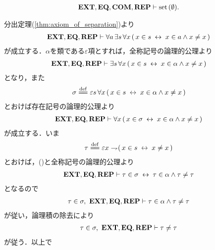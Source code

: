 	\begin{screen}
		\begin{thm}\label{thm:emptyset_is_a_set}
			\begin{align}
				\mbox{{\bf EXT}},\mbox{{\bf EQ}},\mbox{\bf COM},\mbox{{\bf REP}} \vdash \operatorname*{set}\hspace{0.15em}(\emptyset).
			\end{align}
		\end{thm}
	\end{screen}
	
	\begin{sketch}
		分出定理(\ref{thm:axiom_of_separation})より
		\begin{align}
			\mbox{{\bf EXT}},\mbox{{\bf EQ}},\mbox{{\bf REP}} \vdash \forall a\, \exists s\, \forall x\,
			(\, x \in s \hspace{0.25em}\leftrightarrow\hspace{0.25em} x \in a \wedge x \neq x\, )
			\label{fom:thm_emptyset_is_a_set_1}
		\end{align}
		が成立する．$\alpha$を類である$\varepsilon$項とすれば，全称記号の論理的公理より
		\begin{align}
			\mbox{{\bf EXT}},\mbox{{\bf EQ}},\mbox{{\bf REP}} \vdash \exists s\, \forall x\,
			(\, x \in s \hspace{0.25em}\leftrightarrow\hspace{0.25em} x \in \alpha \wedge x \neq x\, )
		\end{align}
		となり，また
		\begin{align}
			\sigma \defeq \varepsilon s\, \forall x\,
			(\, x \in s \lrarrow x \in \alpha \wedge x \neq x\, )
		\end{align}
		とおけば存在記号の論理的公理より
		\begin{align}
			\mbox{{\bf EXT}},\mbox{{\bf EQ}},\mbox{{\bf REP}} \vdash \forall x\,
			(\, x \in \sigma \hspace{0.25em}\leftrightarrow\hspace{0.25em} x \in \alpha \wedge x \neq x\, )
			\label{fom:thm_emptyset_is_a_set_2}
		\end{align}
		が成立する．いま
		\begin{align}
			\tau \defeq \varepsilon x \negation (\, x \in s \lrarrow x \neq x\, )
		\end{align}
		とおけば，()と全称記号の論理的公理より
		\begin{align}
			\mbox{{\bf EXT}},\mbox{{\bf EQ}},\mbox{{\bf REP}} \vdash 
			\tau \in \sigma \hspace{0.25em}\leftrightarrow\hspace{0.25em} \tau \in \alpha \wedge \tau \neq \tau
		\end{align}
		となるので
		\begin{align}
			\tau \in \sigma,\ \mbox{{\bf EXT}},\mbox{{\bf EQ}},\mbox{{\bf REP}} \vdash
			\tau \in \alpha \wedge \tau \neq \tau
		\end{align}
		が従い，論理積の除去により
		\begin{align}
			\tau \in \sigma,\ \mbox{{\bf EXT}},\mbox{{\bf EQ}},\mbox{{\bf REP}} \vdash \tau \neq \tau
		\end{align}
		が従う．以上で
		\begin{align}

\end{align}
\end{sketch}
